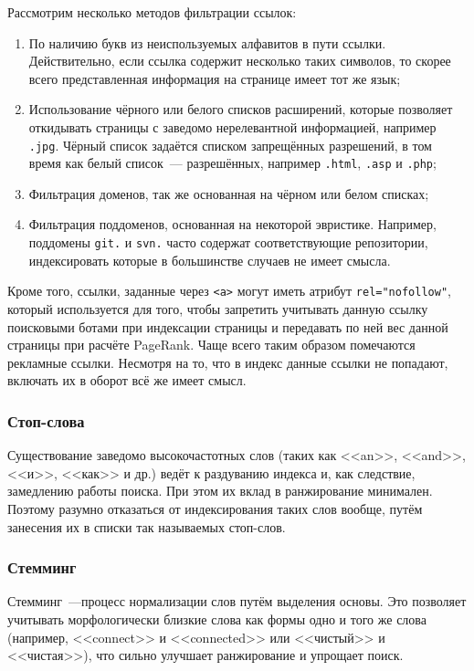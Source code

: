 Рассмотрим несколько методов фильтрации ссылок:
\begin{enumerate}
  \item По наличию букв из неиспользуемых алфавитов в пути ссылки. Действительно, если ссылка содержит несколько таких символов, то скорее всего представленная информация на странице имеет тот же язык;
  \item Использование чёрного или белого списков расширений, которые позволяет откидывать страницы с заведомо нерелевантной информацией, например \verb|.jpg|. Чёрный список задаётся списком запрещённых разрешений, в том время как белый список~--- разрешённых, например \verb|.html|, \verb|.asp| и \verb|.php|;
  \item Фильтрация доменов, так же основанная на чёрном или белом списках;
  \item Фильтрация поддоменов, основанная на некоторой эвристике. Например, поддомены \verb|git.| и \verb|svn.| часто содержат соответствующие репозитории, индексировать которые в большинстве случаев не имеет смысла.
\end{enumerate}


Кроме того, ссылки, заданные через \verb|<a>| могут иметь атрибут \verb|rel="nofollow"|, который используется для того, чтобы запретить учитывать данную ссылку поисковыми ботами при индексации страницы и передавать по ней вес данной страницы при расчёте PageRank. Чаще всего таким образом помечаются рекламные ссылки. Несмотря на то, что в индекс данные ссылки не попадают, включать их в оборот всё же имеет смысл.


\subsubsection{Стоп-слова}
Существование заведомо высокочастотных слов (таких как <<an>>, <<and>>, <<и>>, <<как>> и др.) ведёт к раздуванию индекса и, как следствие, замедлению работы поиска. При этом их вклад в ранжирование минимален. Поэтому разумно отказаться от индексирования таких слов вообще, путём занесения их в списки так называемых стоп-слов.


\subsubsection{Стемминг} \label{sssec:stemming}
Стемминг~---процесс нормализации слов путём выделения основы. Это позволяет учитывать морфологически близкие слова как формы одно и того же слова (например, <<connect>> и <<connected>> или <<чистый>> и <<чистая>>), что сильно улучшает ранжирование и упрощает поиск.

